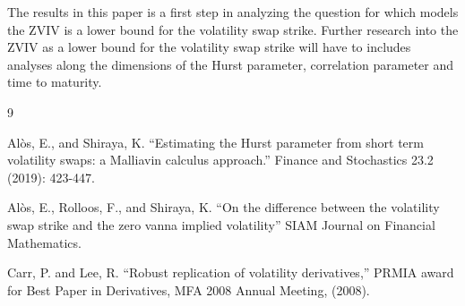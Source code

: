 \documentclass[11pt]{article}
\begin{document}
The results in this paper is a first step in analyzing the question for which models the ZVIV is a lower bound for the volatility swap strike. Further research into the ZVIV as a lower bound for the volatility swap strike will have to includes analyses along the dimensions of the Hurst parameter, correlation parameter and time to maturity.

\begin{thebibliography}{9}





 Al\`{o}s, E., and Shiraya, K. ``Estimating the Hurst parameter from short term volatility swaps: a Malliavin calculus approach.'' Finance and Stochastics 23.2 (2019): 423-447.

 Al\`{o}s, E., Rolloos, F., and Shiraya, K. ``On the difference between the volatility swap strike and the zero vanna implied volatility'' SIAM Journal on Financial Mathematics.



 Carr, P. and Lee, R. ``Robust replication of volatility derivatives,'' PRMIA award for Best Paper in Derivatives, MFA 2008 Annual Meeting, (2008).




\end{thebibliography}
\end{document}
